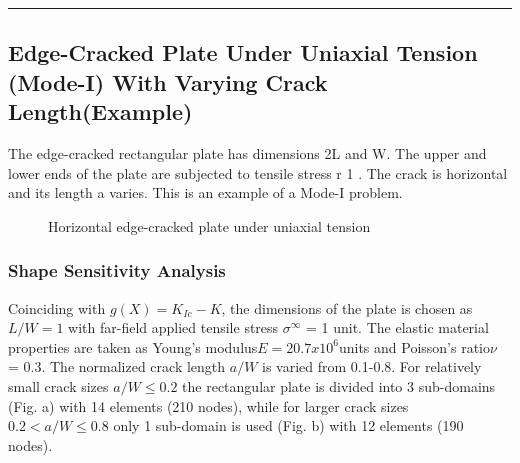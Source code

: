 \documentclass[12pt]{article}
\begin{document}
\rule{\textwidth}{.1em}
\subsection{Edge-Cracked Plate Under Uniaxial Tension (Mode-I) With Varying Crack Length(Example)}
The edge-cracked rectangular plate has dimensions 2L and W. The upper and lower ends of the plate are subjected
to tensile stress r 1 . The crack is horizontal and its length a varies. This is an example of a Mode-I problem.

\begin{figure}[H]
    \centering
    \captionsetup{labelformat=empty}
    \caption{Horizontal edge-cracked plate under uniaxial tension}  
\end{figure}
\subsubsection{Shape Sensitivity Analysis}
Coinciding with $g(X) = K_{Ic} - K$, the dimensions of the plate is chosen as $L/W = 1$ with far-field applied tensile stress $\sigma^\infty$ = 1 unit. The
elastic material properties are taken as Young’s modulus$ E = 20.7 x 10^6 $units and Poisson’s ratio$\nu$ = 0.3. The normalized
crack length $a/W$ is varied from 0.1-0.8. For relatively small crack sizes $a/W \le 0.2$ the rectangular plate is divided into 3
sub-domains (Fig. a) with 14 elements (210 nodes), while for larger crack sizes $0.2 < a/W \le 0.8$ only 1 sub-domain is used
(Fig. b) with 12 elements (190 nodes).
\end{document}
